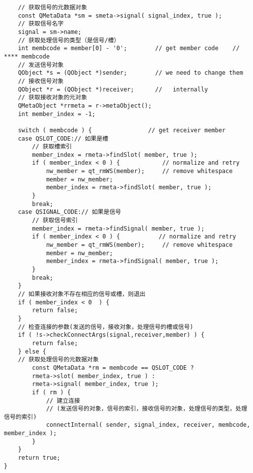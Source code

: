 \documentclass[9pt,b5paper]{article}
\begin{document}
\begin{enumerate}
\begin{lstlisting}
    // 获取信号的元数据对象  
    const QMetaData *sm = smeta->signal( signal_index, true );  
    // 获取信号名字  
    signal = sm->name;         
    // 获取处理信号的类型（是信号/槽）  
    int membcode = member[0] - '0';        // get member code    // **** membcode
    // 发送信号对象  
    QObject *s = (QObject *)sender;        // we need to change them  
    // 接收信号对象  
    QObject *r = (QObject *)receiver;      //   internally  
    // 获取接收对象的元对象  
    QMetaObject *rrmeta = r->metaObject();  
    int member_index = -1;  

    switch ( membcode ) {                // get receiver member  
    case QSLOT_CODE:// 如果是槽  
	    // 获取槽索引  
	    member_index = rmeta->findSlot( member, true );  
	    if ( member_index < 0 ) {            // normalize and retry  
		    nw_member = qt_rmWS(member);     // remove whitespace  
		    member = nw_member;  
		    member_index = rmeta->findSlot( member, true );  
	    }  
	    break;  
    case QSIGNAL_CODE:// 如果是信号  
	    // 获取信号索引  
	    member_index = rmeta->findSignal( member, true );  
	    if ( member_index < 0 ) {           // normalize and retry  
		    nw_member = qt_rmWS(member);     // remove whitespace  
		    member = nw_member;  
		    member_index = rmeta->findSignal( member, true );  
	    }  
	    break;  
    }  
    // 如果接收对象不存在相应的信号或槽，则退出  
    if ( member_index < 0  ) {  
	    return false;  
    }  
    // 检查连接的参数(发送的信号，接收对象，处理信号的槽或信号)  
    if ( !s->checkConnectArgs(signal,receiver,member) ) {  
	    return false;  
    } else {  
	// 获取处理信号的元数据对象  
	    const QMetaData *rm = membcode == QSLOT_CODE ?  
		rmeta->slot( member_index, true ) :  
		rmeta->signal( member_index, true );  
	    if ( rm ) {            
		    // 建立连接  
		    // (发送信号的对象，信号的索引，接收信号的对象，处理信号的类型，处理信号的索引)  
		    connectInternal( sender, signal_index, receiver, membcode, member_index );  
	    }  
    }  
    return true;  
}  


\end{lstlisting}
\end{enumerate}
\end{document}
